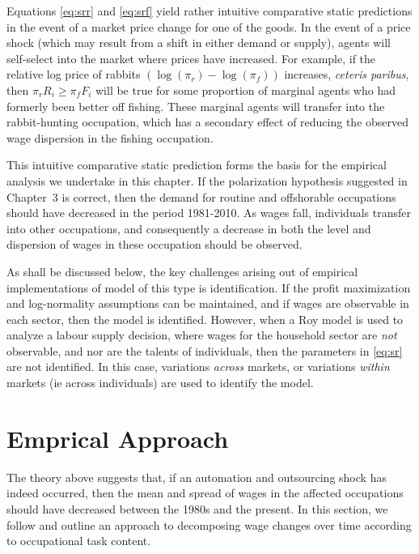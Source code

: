 Equations \eqref{eq:srr} and \eqref{eq:srf} yield rather intuitive comparative static predictions in the event of a market price change for one of the goods. In the event of a price shock (which may result from a shift in either demand or supply), agents will self-select into the market where prices have increased. For example, if the relative log price of rabbits ${\left(\log(\pi_r)-\log(\pi_f)\right)}$ increases, {\em ceteris paribus}, then ${\pi_rR_i \geq \pi_fF_i}$ will be true for some proportion of marginal agents who had formerly been better off fishing. These marginal agents will transfer into the rabbit-hunting occupation, which has a secondary effect of reducing the observed wage dispersion in the fishing occupation.

This intuitive comparative static prediction forms the basis for the empirical analysis we undertake in this chapter. If the polarization hypothesis suggested in Chapter~3 is correct, then the demand for routine and offshorable occupations should have decreased in the period 1981-2010. As wages fall, individuals transfer into other occupations, and consequently a decrease in both the level and dispersion of wages in these occupation should be observed.

As shall be discussed below, the key challenges arising out of empirical implementations of model of this type is identification. If the profit maximization and log-normality assumptions can be maintained, and if wages are observable in each sector, then the model is identified. However, when a Roy model is used to analyze a labour supply decision, where wages for the household sector are {\em not} observable, and nor are the talents of individuals, then the parameters in \eqref{eq:sr} are not identified. In this case, variations {\em across } markets, or variations {\em within } markets (ie across individuals) are used to identify the model.

\section{Emprical Approach}\label{sec:emp}

The theory above suggests that, if an automation and outsourcing shock has indeed occurred, then the mean and spread of wages in the affected occupations should have decreased between the 1980s and the present. In this section, we follow \citet{Firpo2011} and outline an approach to decomposing wage changes over time according to occupational task content.

